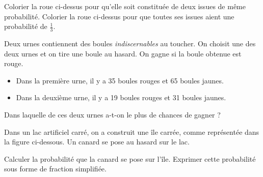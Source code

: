 \documentclass["../Cours.tex"]{subfiles}
\begin{document}
\begin{questions}
    \exercice
    \begin{center}
    \end{center}

    \question Colorier la roue ci-dessus pour qu'elle soit constituée de deux issues de même probabilité.
    \question Colorier la roue ci-dessus pour que toutes ses issues aient une probabilité de $\frac{1}{3}$.

    \clearpage
    \exercice Deux urnes contiennent des boules \emph{indiscernables} au toucher. On choisit une des deux urnes et on tire une boule au hasard. On gagne si la boule obtenue est rouge.
    \begin{itemize}
        \item Dans la première urne, il y a 35 boules rouges et 65 boules jaunes.
        \item Dans la deuxième urne, il y a 19 boules rouges et 31 boules jaunes.
    \end{itemize}
    \question Dans laquelle de ces deux urnes a-t-on le plus de chances de gagner ?

    \exercice Dans un lac artificiel carré, on a construit une île carrée, comme représentée dans la figure ci-dessous. Un canard se pose au hasard sur le lac.

    \begin{center}
    \end{center}

    \question Calculer la probabilité que la canard se pose sur l'île.
    \question Exprimer cette probabilité sous forme de fraction simplifiée.
\end{questions}
\end{document}
